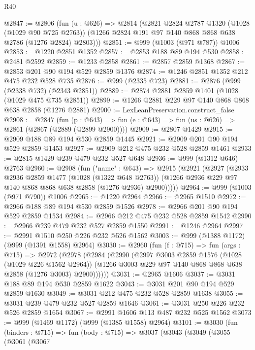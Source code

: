 \begin{lexlean}{R40}
\begin{coremodule}
@2847 := @2806
    (fun (u : @626) =>
    @2814
      (@2821
        @2824
        @2787
        @1320
        (@1028 (@1029 @90 @725 @2763))
        (@1266 @2824 @191 @97 @140 @868 @868 @638 @2786 (@1276 @2824) @2803)))
@2851 := @999 (@1003 (@971 @787)) @1006
@2853 := @1220 @2851 @1352
@2857 := @2853 @188 @89 @194 @530
@2858 := @2481 @2592
@2859 := @1233 @2858
@2861 := @2857 @2859 @1368
@2867 := @2853 @201 @90 @194 @529 @2859 @1376
@2874 := @1246 @2851 @1352 @212 @475 @232 @528 @735
@2876 := @999 (@2335 @723)
@2881 := @2876 (@999 (@2338 @732) (@2343 @2851))
@2889 := @2874 @2881 @2859 @1401 (@1028 (@1029 @475 @735 @2851))
@2899 := @1266 @2881 @229 @97 @140 @868 @868 @638 @2858 (@1276 @2881)
@2900 := LexLeanPreservation.construct_false
@2908 := @2847
    (fun (p : @643) => fun (e : @643) => fun (us : @626) => @2861 (@2867 (@2889 (@2899 @2900))))
@2909 := @2807 @1429
@2915 := @2909 @188 @89 @194 @530 @2859 @1445
@2921 := @2909 @201 @90 @194 @529 @2859 @1453
@2927 := @2909 @212 @475 @232 @528 @2859 @1461
@2933 := @2815 @1429 @239 @479 @232 @527 @648
@2936 := @999 (@1312 @646) @2763
@2960 := @2908
    (fun ("name" : @643) =>
    @2915
      (@2921
        (@2927
          (@2933
            @2936
            @2859
            @1477
            (@1028 (@1322 @648 @2763))
            (@1266 @2936 @229 @97 @140 @868 @868 @638 @2858 (@1276 @2936) @2900)))))
@2964 := @999 (@1003 (@971 @790)) @1006
@2965 := @1220 @2964
@2966 := @2965 @1510
@2972 := @2966 @188 @89 @194 @530 @2859 @1526
@2978 := @2966 @201 @90 @194 @529 @2859 @1534
@2984 := @2966 @212 @475 @232 @528 @2859 @1542
@2990 := @2966 @239 @479 @232 @527 @2859 @1550
@2991 := @1246 @2964
@2997 := @2991 @1510 @250 @226 @232 @526 @1562
@3003 := @999 (@1388 @1172) (@999 (@1391 @1558) @2964)
@3030 := @2960
    (fun (f : @715) =>
    fun (args : @715) =>
    @2972
      (@2978
        (@2984
          (@2990
            (@2997
              @3003
              @2859
              @1576
              (@1028 (@1029 @226 @1562 @2964))
              (@1266 @3003 @229 @97 @140 @868 @868 @638 @2858 (@1276 @3003) @2900))))))
@3031 := @2965 @1606
@3037 := @3031 @188 @89 @194 @530 @2859 @1622
@3043 := @3031 @201 @90 @194 @529 @2859 @1630
@3049 := @3031 @212 @475 @232 @528 @2859 @1638
@3055 := @3031 @239 @479 @232 @527 @2859 @1646
@3061 := @3031 @250 @226 @232 @526 @2859 @1654
@3067 := @2991 @1606 @113 @487 @232 @525 @1562
@3073 := @999 (@1469 @1172) (@999 (@1385 @1558) @2964)
@3101 := @3030
    (fun (binders : @715) =>
    fun (body : @715) =>
    @3037
      (@3043
        (@3049
          (@3055
            (@3061
              (@3067

\end{coremodule}
\end{lexlean}

